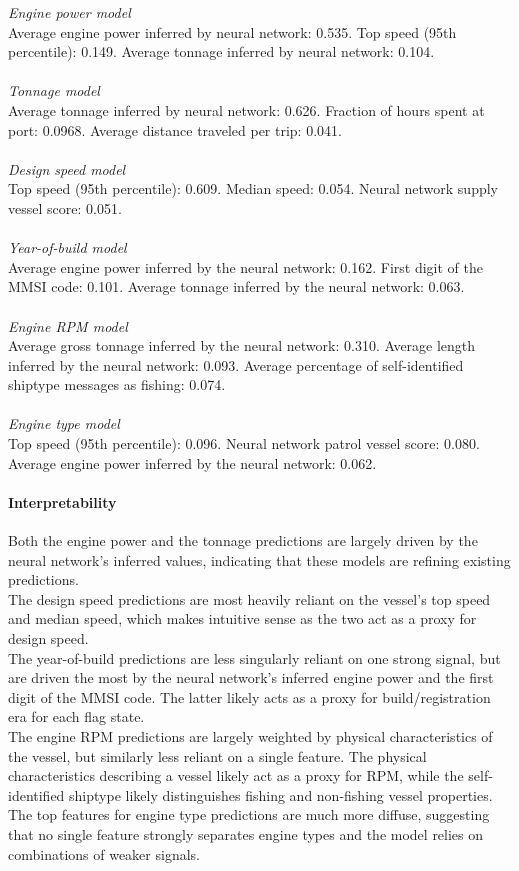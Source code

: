 \documentclass[lineno,pdflatex,sn-nature]{sn-jnl}
\begin{document}
\textit{Engine power model}
\\
Average engine power inferred by neural network: 0.535. Top speed (95th percentile): 0.149. Average tonnage inferred by neural network: 0.104.
\\
\\
\textit{Tonnage model}
\\
Average tonnage inferred by neural network: 0.626. Fraction of hours spent at port: 0.0968. Average distance traveled per trip: 0.041.
\\
\\
\textit{Design speed model}
\\
Top speed (95th percentile): 0.609. Median speed: 0.054. Neural network supply vessel score: 0.051.
\\
\\
\textit{Year-of-build model}
\\
Average engine power inferred by the neural network: 0.162. First digit of the MMSI code: 0.101. Average tonnage inferred by the neural network: 0.063.
\\
\\
\textit{Engine RPM model}
\\
Average gross tonnage inferred by the neural network: 0.310. Average length inferred by the neural network: 0.093. Average percentage of self-identified shiptype messages as fishing: 0.074.
\\
\\
\textit{Engine type model}
\\
Top speed (95th percentile): 0.096. Neural network patrol vessel score: 0.080. Average engine power inferred by the neural network: 0.062.

\paragraph{Interpretability}

Both the engine power and the tonnage predictions are largely driven by the neural network's inferred values, indicating that these models are refining existing predictions.
\\
The design speed predictions are most heavily reliant on the vessel's top speed and median speed, which makes intuitive sense as the two act as a proxy for design speed.
\\
The year-of-build predictions are less singularly reliant on one strong signal, but are driven the most by the neural network's inferred engine power and the first digit of the MMSI code. The latter likely acts as a proxy for build/registration era for each flag state.
\\
The engine RPM predictions are largely weighted by physical characteristics of the vessel, but similarly less reliant on a single feature. The physical characteristics describing a vessel likely act as a proxy for RPM, while the self-identified shiptype likely distinguishes fishing and non-fishing vessel properties.
\\
The top features for engine type predictions are much more diffuse, suggesting that no single feature strongly separates engine types and the model relies on combinations of weaker signals.
\end{document}
